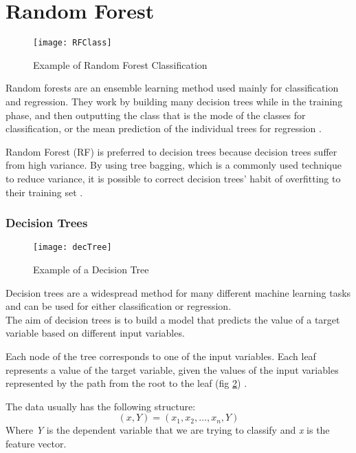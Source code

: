 \clearpage

\section{Random Forest} \label{random_forest}


\begin{figure}[H]
	\centering
	\texttt{[image: RFClass]}
	\caption{Example of Random Forest Classification \cite{medium:RF}}
	\label{fig:RFClass}
\end{figure}

Random forests are an ensemble learning method used mainly for classification and regression. They work by building many decision trees while in the training phase, and then outputting the class that is the mode of the classes for classification, or the mean prediction of the individual trees for regression \cite{wiki:randomforest}\cite{RDF}.

Random Forest (RF) is preferred to decision trees because decision trees suffer from high variance. By using tree bagging, which is a commonly used technique to reduce variance, it is possible to correct decision trees' habit of overfitting to their training set \cite{ESL}.

\subsubsection{Decision Trees}
\begin{figure}[H]
	\centering
	\texttt{[image: decTree]}
	\caption{Example of a Decision Tree \cite{KDNrf}}
	\label{fig:decTree}
\end{figure}

Decision trees are a widespread method for many different machine learning tasks and can be used for either classification or regression.\\
The aim of decision trees is to build a model that predicts the value of a target variable based on different input variables. 

Each node of the tree corresponds to one of the input variables. Each leaf represents a value of the target variable, given the values of the input variables represented by the path from the root to the leaf (fig \ref{fig:decTree}) \cite{wiki:DT}.

The data usually has the following structure: 
\begin{equation}
	(x, Y) = (x_1, x_2, \dots, x_n, Y)
\end{equation}
Where \textit{Y} is the dependent variable that we are trying to classify and \textit{x} is the feature vector.

